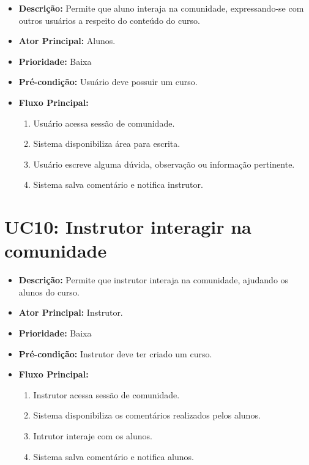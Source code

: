         \begin{itemize}
            \item \textbf{Descrição:} Permite que aluno interaja na comunidade, expressando-se com outros usuários a respeito do conteúdo do curso.
            
            \item \textbf{Ator Principal:} Alunos.
            
            \item \textbf{Prioridade:} Baixa
            
            \item \textbf{Pré-condição:} Usuário deve possuir um curso.
            
            \item \textbf{Fluxo Principal:}
            \begin{enumerate}
                \item Usuário acessa sessão de comunidade.
                \item Sistema disponibiliza área para escrita.
                \item Usuário escreve alguma dúvida, observação ou informação pertinente.
                \item Sistema salva comentário e notifica instrutor.
            \end{enumerate}
        \end{itemize}

        \section*{UC10: Instrutor interagir na comunidade}

        \begin{itemize}
            \item \textbf{Descrição:} Permite que instrutor interaja na comunidade, ajudando os alunos do curso.
            
            \item \textbf{Ator Principal:} Instrutor.
            
            \item \textbf{Prioridade:} Baixa
            
            \item \textbf{Pré-condição:} Instrutor deve ter criado um curso.
            
            \item \textbf{Fluxo Principal:}
            \begin{enumerate}
                \item Instrutor acessa sessão de comunidade.
                \item Sistema disponibiliza os comentários realizados pelos alunos.
                \item Intrutor interaje com os alunos.
                \item Sistema salva comentário e notifica alunos.
            \end{enumerate}
        \end{itemize}


